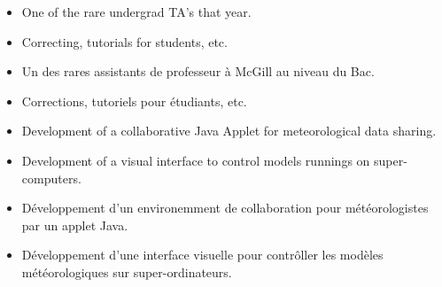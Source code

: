 \vspace{4 mm}

\begin{langen}
\begin{itemize}%
\item One of the rare undergrad TA's that year.
\item Correcting, tutorials for students, etc.
\end{itemize}
\end{langen}
\begin{langfr}
\begin{itemize}%
\item Un des rares assistants de professeur \`{a} McGill au niveau du Bac.
\item Corrections, tutoriels pour \'{e}tudiants, etc.
\end{itemize}
\end{langfr}

\vspace{4 mm}

\begin{langen}
\begin{itemize}
\item Development of a collaborative Java Applet for meteorological data sharing.
\item Development of a visual interface to control models runnings on super-computers.
\end{itemize}
\end{langen}
\begin{langfr}
\begin{itemize}
\item D\'{e}veloppement d'un environemment de collaboration pour m\'{e}t\'{e}orologistes par un applet Java.
\item D\'{e}veloppement d'une interface visuelle pour contr\^{o}ller les mod\`{e}les m\'{e}t\'{e}orologiques sur super-ordinateurs.
\end{itemize}
\end{langfr}


